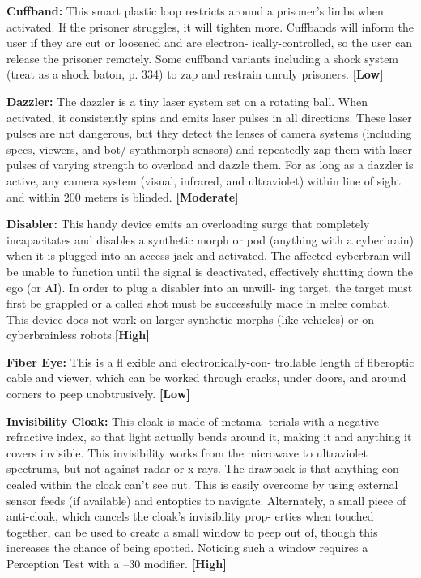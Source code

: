 \textbf{Cuffband:} This smart plastic loop restricts around 
a prisoner's limbs when activated. If the prisoner 
struggles, it will tighten more. Cuffbands will inform 
the user if they are cut or loosened and are electron-
ically-controlled, so the user can release the prisoner 
remotely. Some cuffband variants including a shock 
system (treat as a shock baton, p. 334) to zap and 
restrain unruly prisoners. \textbf{[Low]}

\textbf{Dazzler:} The dazzler is a tiny laser system set on 
a rotating ball. When activated, it consistently spins 
and emits laser pulses in all directions. These laser 
pulses are not dangerous, but they detect the lenses 
of camera systems (including specs, viewers, and bot/
synthmorph sensors) and repeatedly zap them with 
laser pulses of varying strength to overload and dazzle 
them. For as long as a dazzler is active, any camera 
system (visual, infrared, and ultraviolet) within line 
of sight and within 200 meters is blinded. \textbf{[Moderate]}

\textbf{Disabler:} This handy device emits an overloading 
surge that completely incapacitates and disables a 
synthetic morph or pod (anything with a cyberbrain) 
when it is plugged into an access jack and activated. 
The affected cyberbrain will be unable to function until 
the signal is deactivated, effectively shutting down the 
ego (or AI). In order to plug a disabler into an unwill-
ing target, the target must first be grappled or a called 
shot must be successfully made in melee combat. This 
device does not work on larger synthetic morphs (like 
vehicles) or on cyberbrainless robots.\textbf{[High]}

\textbf{Fiber Eye:} This is a fl exible and electronically-con-
trollable length of fiberoptic cable and viewer, which 
can be worked through cracks, under doors, and 
around corners to peep unobtrusively. \textbf{[Low]}

\textbf{Invisibility Cloak:} This cloak is made of metama-
terials with a negative refractive index, so that light 
actually bends around it, making it and anything it 
covers invisible. This invisibility works from the 
microwave to ultraviolet spectrums, but not against 
radar or x-rays. The drawback is that anything con-
cealed within the cloak can't see out. This is easily 
overcome by using external sensor feeds (if available) 
and entoptics to navigate. Alternately, a small piece of 
anti-cloak, which cancels the cloak's invisibility prop-
erties when touched together, can be used to create a 
small window to peep out of, though this increases 
the chance of being spotted. Noticing such a window 
requires a Perception Test with a –30 modifier. \textbf{[High]}

